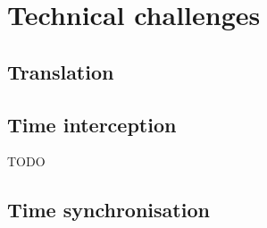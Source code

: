 \documentclass[12pt, a4paper]{memoir}
\begin{document}
\section{Technical challenges}
\subsection{Translation}
\subsection{Time interception}
TODO

%
%
%
%	
%
%
%


\subsection{Time synchronisation}
\end{document}

